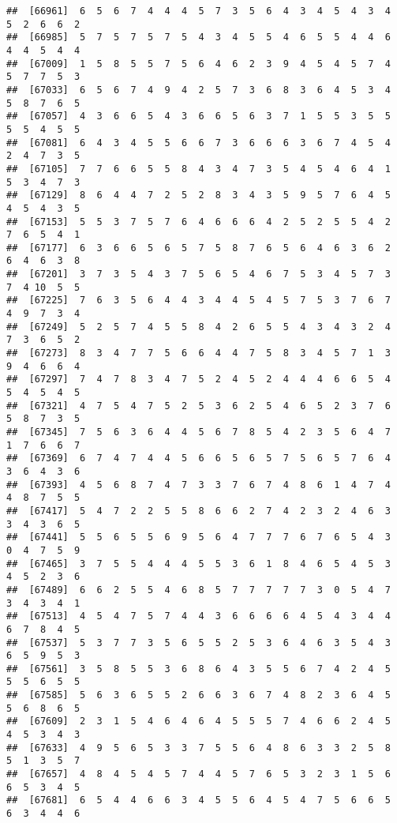 \documentclass[
]{book}
\begin{document}
\begin{verbatim}
##  [66961]  6  5  6  7  4  4  4  5  7  3  5  6  4  3  4  5  4  3  4  5  2  6  6  2
##  [66985]  5  7  5  7  5  7  5  4  3  4  5  5  4  6  5  5  4  4  6  4  4  5  4  4
##  [67009]  1  5  8  5  5  7  5  6  4  6  2  3  9  4  5  4  5  7  4  5  7  7  5  3
##  [67033]  6  5  6  7  4  9  4  2  5  7  3  6  8  3  6  4  5  3  4  5  8  7  6  5
##  [67057]  4  3  6  6  5  4  3  6  6  5  6  3  7  1  5  5  3  5  5  5  5  4  5  5
##  [67081]  6  4  3  4  5  5  6  6  7  3  6  6  6  3  6  7  4  5  4  2  4  7  3  5
##  [67105]  7  7  6  6  5  5  8  4  3  4  7  3  5  4  5  4  6  4  1  5  3  4  7  3
##  [67129]  8  6  4  4  7  2  5  2  8  3  4  3  5  9  5  7  6  4  5  4  5  4  3  5
##  [67153]  5  5  3  7  5  7  6  4  6  6  6  4  2  5  2  5  5  4  2  7  6  5  4  1
##  [67177]  6  3  6  6  5  6  5  7  5  8  7  6  5  6  4  6  3  6  2  6  4  6  3  8
##  [67201]  3  7  3  5  4  3  7  5  6  5  4  6  7  5  3  4  5  7  3  7  4 10  5  5
##  [67225]  7  6  3  5  6  4  4  3  4  4  5  4  5  7  5  3  7  6  7  4  9  7  3  4
##  [67249]  5  2  5  7  4  5  5  8  4  2  6  5  5  4  3  4  3  2  4  7  3  6  5  2
##  [67273]  8  3  4  7  7  5  6  6  4  4  7  5  8  3  4  5  7  1  3  9  4  6  6  4
##  [67297]  7  4  7  8  3  4  7  5  2  4  5  2  4  4  4  6  6  5  4  5  4  5  4  5
##  [67321]  4  7  5  4  7  5  2  5  3  6  2  5  4  6  5  2  3  7  6  5  8  7  3  5
##  [67345]  7  5  6  3  6  4  4  5  6  7  8  5  4  2  3  5  6  4  7  1  7  6  6  7
##  [67369]  6  7  4  7  4  4  5  6  6  5  6  5  7  5  6  5  7  6  4  3  6  4  3  6
##  [67393]  4  5  6  8  7  4  7  3  3  7  6  7  4  8  6  1  4  7  4  4  8  7  5  5
##  [67417]  5  4  7  2  2  5  5  8  6  6  2  7  4  2  3  2  4  6  3  3  4  3  6  5
##  [67441]  5  5  6  5  5  6  9  5  6  4  7  7  7  6  7  6  5  4  3  0  4  7  5  9
##  [67465]  3  7  5  5  4  4  4  5  5  3  6  1  8  4  6  5  4  5  3  4  5  2  3  6
##  [67489]  6  6  2  5  5  4  6  8  5  7  7  7  7  7  3  0  5  4  7  3  4  3  4  1
##  [67513]  4  5  4  7  5  7  4  4  3  6  6  6  6  4  5  4  3  4  4  6  7  8  4  5
##  [67537]  5  3  7  7  3  5  6  5  5  2  5  3  6  4  6  3  5  4  3  6  5  9  5  3
##  [67561]  3  5  8  5  5  3  6  8  6  4  3  5  5  6  7  4  2  4  5  5  5  6  5  5
##  [67585]  5  6  3  6  5  5  2  6  6  3  6  7  4  8  2  3  6  4  5  5  6  8  6  5
##  [67609]  2  3  1  5  4  6  4  6  4  5  5  5  7  4  6  6  2  4  5  4  5  3  4  3
##  [67633]  4  9  5  6  5  3  3  7  5  5  6  4  8  6  3  3  2  5  8  5  1  3  5  7
##  [67657]  4  8  4  5  4  5  7  4  4  5  7  6  5  3  2  3  1  5  6  6  5  3  4  5
##  [67681]  6  5  4  4  6  6  3  4  5  5  6  4  5  4  7  5  6  6  5  6  3  4  4  6

\end{verbatim}
\end{document}
